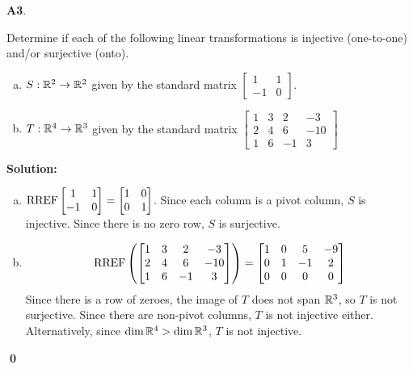 \documentclass{article}
\newenvironment{problem}[1]
{
  \begin{flushleft}
  \textbf{#1}.
  \ignorespaces
}
{
  \end{flushleft}
}
\newenvironment{solution}
{
  \ignorespaces
  \textbf{Solution:}
}
{
  \ignorespacesafterend
  \begin{flushright}
  {\bfseries \qed}
  \end{flushright}
}
\begin{document}
\begin{problem}{A3}
Determine if each of the following linear transformations is injective (one-to-one) and/or surjective (onto).
\begin{enumerate}[(a)]
\item $S: \mathbb{R}^2 \rightarrow \mathbb{R}^2$ given by the standard matrix $\begin{bmatrix} 1 & 1 \\ -1 & 0 \end{bmatrix}$.
\item $T: \mathbb{R}^4 \rightarrow \mathbb{R}^3$ given by the standard matrix $\begin{bmatrix} 1 & 3 & 2 & -3 \\ 2 & 4 & 6 & -10 \\ 1 & 6 & -1 & 3 \end{bmatrix}$
\end{enumerate}
\end{problem}
\begin{solution}
\begin{enumerate}[(a)]
\item $ \operatorname{RREF}\begin{bmatrix} 1 & 1 \\ -1 & 0 \end{bmatrix}=\begin{bmatrix}1 & 0 \\ 0 & 1 \end{bmatrix}$.  Since each column is a pivot column, $S$ is injective.  Since there is no zero row, $S$ is surjective.
\item $$\operatorname{RREF}\left(\begin{bmatrix}1 & 3 & 2 & -3 \\ 2 & 4 & 6 & -10 \\ 1 & 6 & -1 & 3 \end{bmatrix}\right) = \begin{bmatrix} 1 & 0 & 5 & -9 \\ 0 & 1 & -1 & 2 \\ 0 & 0 & 0 & 0\end{bmatrix}$$
Since there is a row of zeroes, the image of \(T\) does not span \(\mathbb{R}^3\), so \(T\) is not surjective.  Since there are non-pivot columns, \(T\) is not injective either.  Alternatively, since $\dim \mathbb{R}^4 > \dim \mathbb{R}^3$, $T$ is not injective.

\end{enumerate}
\end{solution}
\end{document}
